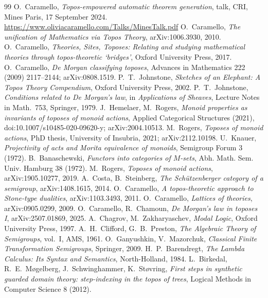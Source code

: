 \begin{thebibliography}{99}
 O.~Caramello, \emph{Topos-empowered automatic theorem generation}, talk, CRI, Mines Paris, 17 September 2024. \url{https://www.oliviacaramello.com/Talks/MinesTalk.pdf}
 O.~Caramello, \emph{The unification of Mathematics via Topos Theory}, arXiv:1006.3930, 2010.
 O.~Caramello, \emph{Theories, Sites, Toposes: Relating and studying mathematical theories through topos-theoretic `bridges'}, Oxford University Press, 2017.
 O.~Caramello, \emph{De Morgan classifying toposes}, Advances in Mathematics 222 (2009) 2117--2144; arXiv:0808.1519.
 P.~T.~Johnstone, \emph{Sketches of an Elephant: A Topos Theory Compendium}, Oxford University Press, 2002.
 P.~T.~Johnstone, \emph{Conditions related to De Morgan's law}, in \emph{Applications of Sheaves}, Lecture Notes in Math.~753, Springer, 1979.
 J.~Hemelaer, M.~Rogers, \emph{Monoid properties as invariants of toposes of monoid actions}, Applied Categorical Structures (2021), doi:10.1007/s10485-020-09620-y; arXiv:2004.10513.
 M.~Rogers, \emph{Toposes of monoid actions}, PhD thesis, University of Insubria, 2021; arXiv:2112.10198.
 U.~Knauer, \emph{Projectivity of acts and Morita equivalence of monoids}, Semigroup Forum 3 (1972).
 B.~Banaschewski, \emph{Functors into categories of $M$-sets}, Abh. Math. Sem. Univ. Hamburg 38 (1972).
 M.~Rogers, \emph{Toposes of monoid actions}, arXiv:1905.10277, 2019.
 A.~Costa, B.~Steinberg, \emph{The Schützenberger category of a semigroup}, arXiv:1408.1615, 2014.
 O.~Caramello, \emph{A topos-theoretic approach to Stone-type dualities}, arXiv:1103.3493, 2011.
 O.~Caramello, \emph{Lattices of theories}, arXiv:0905.0299, 2009.
 O.~Caramello, R.~Chamoun, \emph{De Morgan's law in toposes I}, arXiv:2507.01869, 2025.
 A.~Chagrov, M.~Zakharyaschev, \emph{Modal Logic}, Oxford University Press, 1997.
 A.~H.~Clifford, G.~B.~Preston, \emph{The Algebraic Theory of Semigroups}, vol.~I, AMS, 1961.
 O.~Ganyushkin, V.~Mazorchuk, \emph{Classical Finite Transformation Semigroups}, Springer, 2009.
 H.~P.~Barendregt, \emph{The Lambda Calculus: Its Syntax and Semantics}, North-Holland, 1984.
 L.~Birkedal, R.~E.~Møgelberg, J.~Schwinghammer, K.~Støvring, \emph{First steps in synthetic guarded domain theory: step-indexing in the topos of trees}, Logical Methods in Computer Science 8 (2012).
\end{thebibliography}
